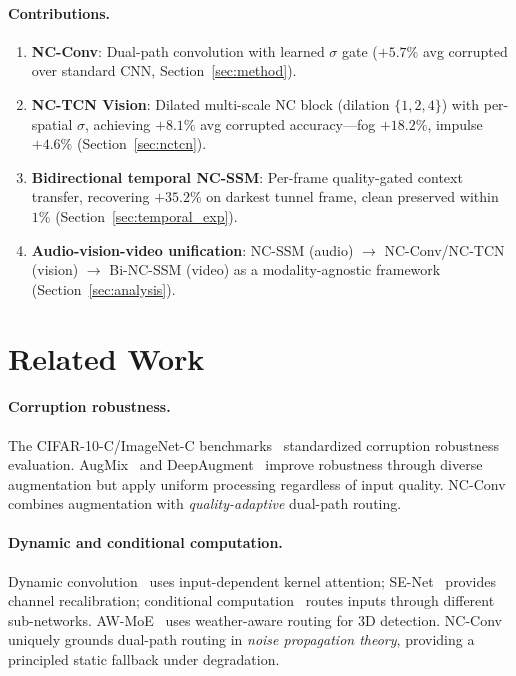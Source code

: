 \documentclass[10pt,twocolumn,letterpaper]{article}
\begin{document}
\paragraph{Contributions.}
\begin{enumerate}
\setlength\itemsep{0pt}
\item \textbf{NC-Conv}: Dual-path convolution with learned $\sigma$ gate ($+5.7\%$ avg corrupted over standard CNN, Section~\ref{sec:method}).
\item \textbf{NC-TCN Vision}: Dilated multi-scale NC block (dilation $\{1,2,4\}$) with per-spatial $\sigma$, achieving $\mathbf{+8.1\%}$ avg corrupted accuracy---fog $+18.2\%$, impulse $+4.6\%$ (Section~\ref{sec:nctcn}).
\item \textbf{Bidirectional temporal NC-SSM}: Per-frame quality-gated context transfer, recovering $+35.2\%$ on darkest tunnel frame, clean preserved within $1\%$ (Section~\ref{sec:temporal_exp}).
\item \textbf{Audio-vision-video unification}: NC-SSM (audio) $\to$ NC-Conv/NC-TCN (vision) $\to$ Bi-NC-SSM (video) as a modality-agnostic framework (Section~\ref{sec:analysis}).
\end{enumerate}

\section{Related Work}
\label{sec:related}

\paragraph{Corruption robustness.}
The CIFAR-10-C/ImageNet-C benchmarks~\cite{hendrycks2019benchmarking} standardized corruption robustness evaluation.
AugMix~\cite{hendrycks2020augmix} and DeepAugment~\cite{hendrycks2021deepaugment} improve robustness through diverse augmentation but apply uniform processing regardless of input quality.
NC-Conv combines augmentation with \emph{quality-adaptive} dual-path routing.

\paragraph{Dynamic and conditional computation.}
Dynamic convolution~\cite{chen2020dynamic} uses input-dependent kernel attention; SE-Net~\cite{hu2018squeeze} provides channel recalibration; conditional computation~\cite{bengio2013estimating} routes inputs through different sub-networks.
AW-MoE~\cite{awmoe2026} uses weather-aware routing for 3D detection.
NC-Conv uniquely grounds dual-path routing in \emph{noise propagation theory}, providing a principled static fallback under degradation.
\end{document}
